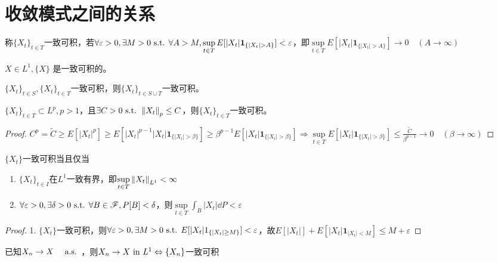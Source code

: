 \documentclass{ctexbook}
\begin{document}
\section{收敛模式之间的关系}
\begin{Def}
  称$\{X_{t}\}_{t\in T}$一致可积，若$\forall\varepsilon>0,\exists M>0\st \forall A>M, \sup\limits_{t\in T}E[|X_{t}|\bm{1}_{\{|X_{t}|>A\}}]<\varepsilon$，即$\sup\limits_{t\in T}E[|X_{t}|\bm{1}_{\{|X_{t}|>A\}}]\to 0\quad(A\to\infty)$
\end{Def}

\begin{Eg}
  $X\in L^{1},\{X\}$ 是一致可积的。
\end{Eg}

\begin{Eg}
  $\{X_{t}\}_{t\in S},\{X_{t}\}_{t\in T}$一致可积，则$\{X_{t}\}_{t\in S\cup T}$一致可积。
\end{Eg}

\begin{Eg}
  $\{X_{t}\}_{t\in T}\subset L^{p},p>1$，且$\exists C>0\text{ s.t. }\left\|X_{t}\right\|_{p}\leq C$，则$\{X_{t}\}_{t\in T}$一致可积。
\end{Eg}

\begin{proof}
  $C^{p}=\tilde C\geq E[|X_{t}|^{p}]\geq E[|X_{t}|^{p-1}|X_{t}|\bm{1}_{\{|X_{t}|>\beta\}}]\geq \beta^{p-1}E[|X_{t}|\bm{1}_{\{|X_{t}|>\beta\}}]\Rightarrow \sup\limits_{t\in T}E[|X_{t}|\bm{1}_{\{|X_{t}|>\beta\}}]\leq\frac{\tilde C}{\beta^{p-1}}\to 0\quad (\beta\to\infty)$
\end{proof}

\begin{Thm}
  $\{X_{t}\}$一致可积当且仅当
  \begin{enumerate}
  \item $\{X_{t}\}_{t\in I}$在$L^{1}$一致有界，即$\sup\limits_{t\in T}\left\|X_{t}\right\|_{L^{1}}<\infty$
  \item $\forall\varepsilon>0, \exists \delta>0\text{ s.t. }\forall B\in \mathscr{F}, P[B]<\delta$，则$\sup\limits_{t\in T}\int_{B}|X_{t}|\dd P<\varepsilon$
  \end{enumerate}
\end{Thm}

\begin{proof}
  1. $\{X_{t}\}$一致可积，则$\forall\varepsilon>0,\exists M>0\text{ s.t. } E[|X_{t}|1_{\{|X_{t}|\geq M\}}]<\varepsilon$，故$E[|X_{t}|]+E[|X_{t}|\bm{1}_{|X_{t}|<M}]\leq M+\varepsilon$
\end{proof}
\begin{Thm}
  已知$X_{n}\to X\quad \text{ a.s. }$，则$X_{n}\to X\text{ in } L^{1}\Leftrightarrow \{X_{n}\}$一致可积
\end{Thm}
\end{document}
